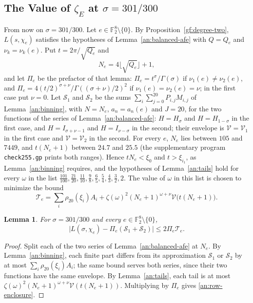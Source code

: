 \documentclass[11pt]{amsart}
\numberwithin{equation}{section}
\newtheorem{lemma}[equation]{Lemma}
\theoremstyle{definition}
\theoremstyle{remark}
\newcommand{\Ftwo}{\mathbb F_2}
\begin{document}
\subsection{\texorpdfstring{The Value of $\zeta_E$ at $\sigma=301/300$}{The Value of zeta(E) at sigma = 301/300}}
\label{an:value-section}
From now on $\sigma=301/300$. Let $e\in\Ftwo^8\setminus\{0\}$. By
Proposition~\ref{gf:degree-two}, $L(s,\chi_e)$ satisfies the hypotheses of
Lemma~\ref{an:balanced-afe} with $Q=Q_e$ and $\nu_k=\nu_k(e)$. Put
$t=2\pi/\sqrt{Q_e}$ and
\[
 N_e=4\lfloor\sqrt{Q_e}\rfloor+1,
\]
and let $\Pi_e$ be the prefactor of that lemma:
$\Pi_e=t^\sigma/\Gamma(\sigma)$ if $\nu_1(e)\ne\nu_2(e)$, and
$\Pi_e=4(t/2)^{\sigma+\nu}/\Gamma((\sigma+\nu)/2)^2$ if
$\nu_1(e)=\nu_2(e)=\nu$; in the first case put $\nu=0$. Let
$\mathcal S_1$ and $\mathcal S_2$ be the sums
$\sum_i\sum_{j=0}^{20}P_{i,j}M_{i,j}$ of Lemma~\ref{an:binning}, with
$N=N_e$, $a_n=a_n(e)$ and $J=20$, for the two functions of the series of
Lemma~\ref{an:balanced-afe}: $H=H_\sigma$ and $H=H_{1-\sigma}$ in the first
case, and $H=I_{\sigma+\nu-1}$ and $H=I_{\nu-\sigma}$ in the second; their
envelope is $\mathcal V=\mathcal V_1$ in the first case and
$\mathcal V=\mathcal V_2$ in the second. For every $e$, $N_e$ lies between
$105$ and $7449$, and $t(N_e+1)$ between $24.7$ and $25.5$ (the
supplementary program \texttt{check255.gp} prints both ranges). Hence
$tN_e<\xi_0$ and $t>\xi_{i_1}$, as Lemma~\ref{an:binning} requires, and the
hypotheses of Lemma~\ref{an:tails} hold for every $\omega$ in the list
$\frac{101}{100},\frac{21}{20},\frac{11}{10},\frac98,\frac65,\frac54,
\frac43,\frac32,2$. The value of $\omega$ in this list is chosen to minimize
the bound
\[
 \mathcal T_e=\sum_i\rho_{20}(\xi_i)A_i
 +\zeta(\omega)^2(N_e+1)^{\omega+\nu}\mathcal V\bigl(t(N_e+1)\bigr).
\]

\begin{lemma}\label{an:row}
For $\sigma=301/300$ and every $e\in\Ftwo^8\setminus\{0\}$,
\begin{equation}\label{an:row-enclosure}
 \bigl|L(\sigma,\chi_e)-\Pi_e(\mathcal S_1+\mathcal S_2)\bigr|
 \le2\Pi_e\mathcal T_e.
\end{equation}
\end{lemma}

\begin{proof}
Split each of the two series of Lemma~\ref{an:balanced-afe} at $N_e$. By
Lemma~\ref{an:binning}, each finite part differs from its approximation
$\mathcal S_1$ or $\mathcal S_2$ by at most $\sum_i\rho_{20}(\xi_i)A_i$; the
same bound serves both series, since their two functions have the same
envelope. By Lemma~\ref{an:tails}, each tail is at most
$\zeta(\omega)^2(N_e+1)^{\omega+\nu}\mathcal V(t(N_e+1))$. Multiplying by
$\Pi_e$ gives \eqref{an:row-enclosure}.
\end{proof}
\end{document}
